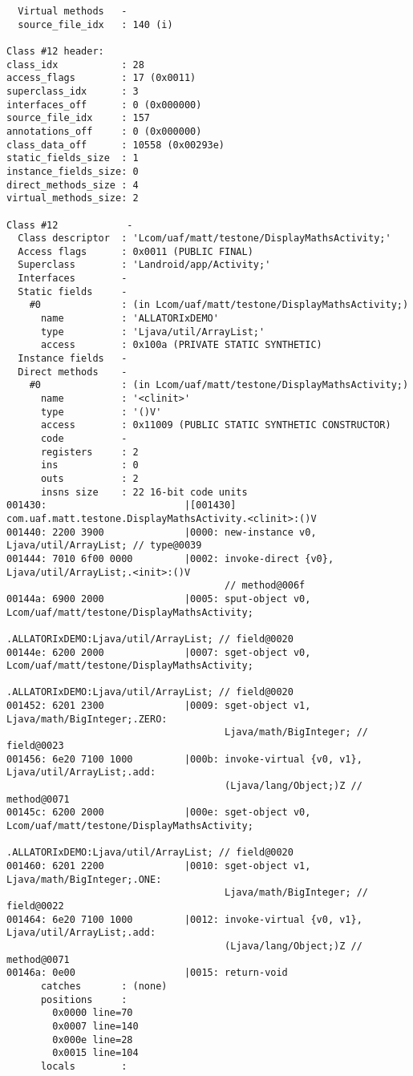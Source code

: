 \begin{lstlisting}
  Virtual methods   -
  source_file_idx   : 140 (i)

Class #12 header:
class_idx           : 28
access_flags        : 17 (0x0011)
superclass_idx      : 3
interfaces_off      : 0 (0x000000)
source_file_idx     : 157
annotations_off     : 0 (0x000000)
class_data_off      : 10558 (0x00293e)
static_fields_size  : 1
instance_fields_size: 0
direct_methods_size : 4
virtual_methods_size: 2

Class #12            -
  Class descriptor  : 'Lcom/uaf/matt/testone/DisplayMathsActivity;'
  Access flags      : 0x0011 (PUBLIC FINAL)
  Superclass        : 'Landroid/app/Activity;'
  Interfaces        -
  Static fields     -
    #0              : (in Lcom/uaf/matt/testone/DisplayMathsActivity;)
      name          : 'ALLATORIxDEMO'
      type          : 'Ljava/util/ArrayList;'
      access        : 0x100a (PRIVATE STATIC SYNTHETIC)
  Instance fields   -
  Direct methods    -
    #0              : (in Lcom/uaf/matt/testone/DisplayMathsActivity;)
      name          : '<clinit>'
      type          : '()V'
      access        : 0x11009 (PUBLIC STATIC SYNTHETIC CONSTRUCTOR)
      code          -
      registers     : 2
      ins           : 0
      outs          : 2
      insns size    : 22 16-bit code units
001430:                        |[001430] com.uaf.matt.testone.DisplayMathsActivity.<clinit>:()V
001440: 2200 3900              |0000: new-instance v0, Ljava/util/ArrayList; // type@0039
001444: 7010 6f00 0000         |0002: invoke-direct {v0}, Ljava/util/ArrayList;.<init>:()V
                                      // method@006f
00144a: 6900 2000              |0005: sput-object v0, Lcom/uaf/matt/testone/DisplayMathsActivity;
                                      .ALLATORIxDEMO:Ljava/util/ArrayList; // field@0020
00144e: 6200 2000              |0007: sget-object v0, Lcom/uaf/matt/testone/DisplayMathsActivity;
                                      .ALLATORIxDEMO:Ljava/util/ArrayList; // field@0020
001452: 6201 2300              |0009: sget-object v1, Ljava/math/BigInteger;.ZERO:
                                      Ljava/math/BigInteger; // field@0023
001456: 6e20 7100 1000         |000b: invoke-virtual {v0, v1}, Ljava/util/ArrayList;.add:
                                      (Ljava/lang/Object;)Z // method@0071
00145c: 6200 2000              |000e: sget-object v0, Lcom/uaf/matt/testone/DisplayMathsActivity;
                                      .ALLATORIxDEMO:Ljava/util/ArrayList; // field@0020
001460: 6201 2200              |0010: sget-object v1, Ljava/math/BigInteger;.ONE:
                                      Ljava/math/BigInteger; // field@0022
001464: 6e20 7100 1000         |0012: invoke-virtual {v0, v1}, Ljava/util/ArrayList;.add:
                                      (Ljava/lang/Object;)Z // method@0071
00146a: 0e00                   |0015: return-void
      catches       : (none)
      positions     :
        0x0000 line=70
        0x0007 line=140
        0x000e line=28
        0x0015 line=104
      locals        :


\end{lstlisting}
